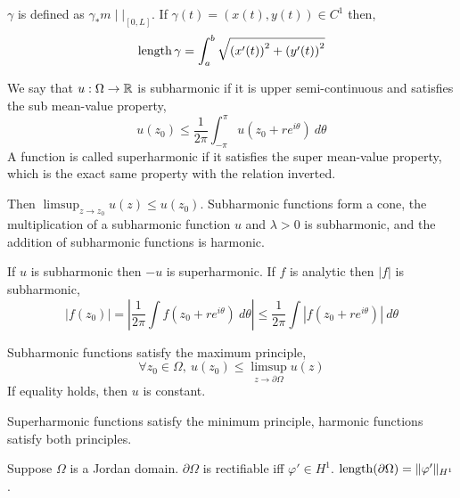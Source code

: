 \begin{definition}
	$\gamma$ is defined as $\gamma_* m \mid |_{[0, L]}$.
	If $\gamma(t) = (x(t), y(t)) \in C^1$ then,
	\[
		\operatorname{length} \gamma
		= \int_a^b \sqrt{{(x'(t))}^2 + {(y'(t))}^2}
	\]
\end{definition}
\begin{definition}
	We say that $u : \Omega \to \mathbb{R}$ is subharmonic if it is upper semi-continuous and satisfies the sub mean-value property,
	\[
		u(z_0)
		\le \frac{1}{2 \pi} \int_{-\pi}^{\pi} u(z_0 + r e^{i \theta})\ d \theta
	\]
	A function is called superharmonic if it satisfies the super mean-value property, which is the exact same property with the relation inverted.
\end{definition}
Then $\limsup_{z \to z_0} u(z) \le u(z_0)$.
Subharmonic functions form a cone, the multiplication of a subharmonic function $u$ and $\lambda > 0$ is subharmonic, and the addition of subharmonic functions is harmonic.
\begin{remark}
	If $u$ is subharmonic then $-u$ is superharmonic.
	If $f$ is analytic then $|f|$ is subharmonic,
	\[
		|f(z_0)|
		= \left\lvert \frac{1}{2 \pi} \int f(z_0 + r e^{i \theta})\ d \theta \right\rvert
		\le \frac{1}{2 \pi} \int |f(z_0 + r e^{i \theta})|\ d \theta
	\]
\end{remark}
Subharmonic functions satisfy the maximum principle,
\[
	\forall z_0 \in \Omega,\ 
	u(z_0) \le \limsup_{z \to \partial \Omega} u(z)
\]
If equality holds, then $u$ is constant.
\begin{remark}
	Superharmonic functions satisfy the minimum principle, harmonic functions satisfy both principles.
\end{remark}
\begin{theorem}[F \& M Riesz]
	Suppose $\Omega$ is a Jordan domain.
	$\partial \Omega$ is rectifiable iff $\varphi' \in H^1$. $\operatorname{length}(\partial \Omega) = \lVert \varphi' \rVert_{H^1}$. 
\end{theorem}
